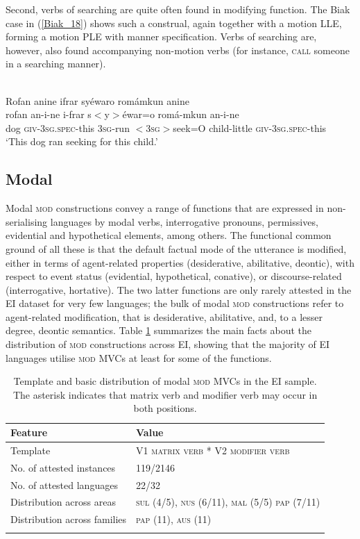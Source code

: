 Second, verbs of searching are quite often found in modifying function. The Biak case in (\ref{Biak_18}) shows such a construal, again together with a motion LLE, forming a motion PLE with manner specification. Verbs of searching are, however, also found accompanying non-motion verbs (for instance, \textsc{call} someone in a searching manner).

\ea \label{Biak_18}
\\
\glll Rofan anine ifrar syéwaro romámkun anine \\
rofan an-i-ne i-frar s$<$y$>$éwar=o romá-mkun an-i-ne \\
dog \textsc{giv}-3\textsc{sg}.\textsc{spec}-this 3\textsc{sg}-run $<$3\textsc{sg}$>$seek=O child-little \textsc{giv}-3\textsc{sg}.\textsc{spec}-this \\
\glft `This dog ran seeking for this child.'\\ 
\z

\subsection{Modal}\label{sec:modal}

Modal \textsc{mod} constructions convey a range of functions that are expressed in non-serialising languages by modal verbs, interrogative pronouns, permissives, evidential and hypothetical elements, among others. The functional common ground of all these is that the default factual mode of the utterance is modified, either in terms of agent-related properties (desiderative, abilitative, deontic),  with respect to event status (evidential, hypothetical, conative), or discourse-related (interrogative, hortative). The two latter functions are only rarely attested in the EI dataset for very few languages; the bulk of modal \textsc{mod} constructions refer to agent-related modification, that is desiderative, abilitative, and, to a lesser degree, deontic semantics. Table \ref{table:modal} summarizes the main facts about the distribution of \textsc{mod} constructions across EI, showing that the majority of EI languages utilise \textsc{mod} MVCs at least for some of the functions.

\begin{table}
\begin{tabular}{ll}
\lsptoprule
Feature&Value\tabularnewline
\hline
Template&V1 \textsc{matrix verb} * V2 \textsc{modifier verb}\tabularnewline
No. of attested instances& 119/2146 \tabularnewline
No. of attested languages& 22/32 \tabularnewline
Distribution across areas& \textsc{sul} (4/5), \textsc{nus} (6/11), \textsc{mal} (5/5) \textsc{pap} (7/11) \tabularnewline
Distribution across families& \textsc{pap} (11), \textsc{aus} (11) \tabularnewline
\lspbottomrule
\end{tabular}
\caption[Template and basic distribution of modal \textsc{mod} MVCs]{Template and basic distribution of modal \textsc{mod} MVCs in the EI sample. The asterisk indicates that matrix verb and modifier verb may occur in both positions.}
\label{table:modal}
\end{table}

